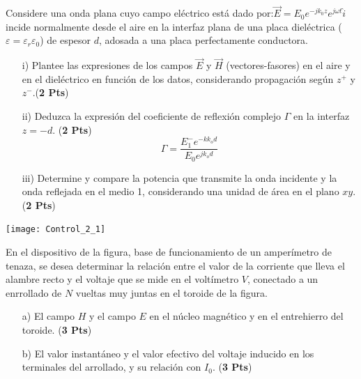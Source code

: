 \documentclass[
  11pt,
  letterpaper,
   addpoints,
  ]{exam}
\begin{document}
\begin{questions}
    \question     
    Considere una onda plana cuyo campo eléctrico está dado por:$ \vec{E} = E_0 e^{-jk_0 z} e^{j\omega t} \hat{i}$
incide normalmente desde el aire en la interfaz plana de una placa dieléctrica (\( \varepsilon = \varepsilon_r \varepsilon_0 \)) de espesor \( d \), adosada a una placa perfectamente conductora.

\vspace{0.5em}

\begin{enumerate}
    \item[i)] Plantee las expresiones de los campos \( \vec{E} \) y \( \vec{H} \) (vectores-fasores) en el aire y en el dieléctrico en función de los datos, considerando propagación según \( z^+ \) y \( z^- \).(\textbf{2 Pts})
    
    \item[ii)] Deduzca la expresión del coeficiente de reflexión complejo \( \Gamma \) en la interfaz \( z = -d \). (\textbf{2 Pts})
    \[
    \Gamma = \frac{E_{1}^{-} e^{-kk_{o}d}}{E_{0}e^{jk_{o}d}} 
    \]
    
    \item[iii)] Determine y compare la potencia que transmite la onda incidente y la onda reflejada en el medio 1, considerando una unidad de área en el plano \( xy \). (\textbf{2 Pts})
\end{enumerate}
    
\begin{center}
    \texttt{[image: Control\_2\_1]}
\end{center}
    \begin{solution}
   
    \end{solution}
    \newpage
    \question   En el dispositivo de la figura, base de funcionamiento de un amperímetro de tenaza, se desea determinar la relación entre el valor de la corriente que lleva el alambre recto y el voltaje que se mide en el voltímetro \(V\), conectado a un enrrollado de \(N\) vueltas muy juntas en el toroide de la figura.
    

    \begin{enumerate}
        \item[a)] El campo \(H\) y el campo \(E\) en el núcleo magnético y en el entrehierro del toroide. (\textbf{3 Pts})
        \item[b)] El valor instantáneo y el valor efectivo del voltaje inducido en los terminales del arrollado, y su relación con \(I_0\). (\textbf{3 Pts})
    \end{enumerate}
    

\end{questions}
\end{document}
